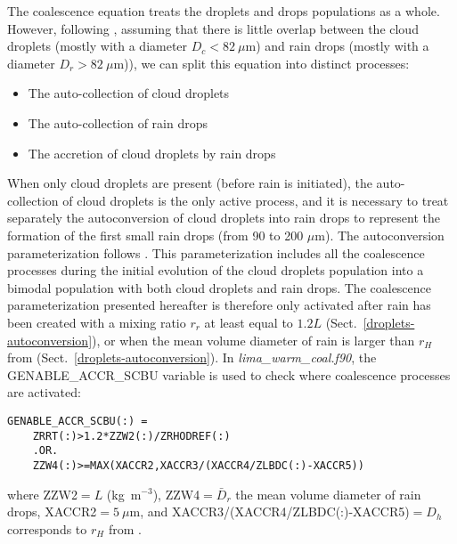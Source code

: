 {The coalescence equation treats the droplets and drops populations as a whole. However, following \citet{Cohard2000c2r2}, assuming that there is little overlap between the cloud droplets (mostly with a diameter $D_c < 82~\mu$m) and rain drops (mostly with a diameter $D_r > 82~\mu$m)), we can split this equation into distinct processes:
\begin{itemize}
 \item The auto-collection of cloud droplets
 \item The auto-collection of rain drops
 \item The accretion of cloud droplets by rain drops
\end{itemize}

When only cloud droplets are present (before rain is initiated), the auto-collection of cloud droplets is the only active process, and it is necessary to treat separately the autoconversion of cloud droplets into rain drops to represent the formation of the first small rain drops (from 90 to 200 $\mu$m). The autoconversion parameterization follows \citet{Berry1974}. This parameterization includes all the coalescence processes during the initial evolution of the cloud droplets population into a bimodal population with both cloud droplets and rain drops. The coalescence parameterization presented hereafter is therefore only activated after rain has been created with a mixing ratio $r_r$ at least equal to $1.2 L$ (Sect.\ \ref{droplets-autoconversion}), or when the mean volume diameter of rain is larger than $r_H$ from \citet{Berry1974} (Sect.\ \ref{droplets-autoconversion}). In \emph{lima\_warm\_coal.f90}, the GENABLE\_ACCR\_SCBU variable is used to check where coalescence processes are activated:
\begin{lstlisting}[frame=single]
 GENABLE_ACCR_SCBU(:) = 
 	ZRRT(:)>1.2*ZZW2(:)/ZRHODREF(:)
 	.OR.
	ZZW4(:)>=MAX(XACCR2,XACCR3/(XACCR4/ZLBDC(:)-XACCR5))
\end{lstlisting}
where ZZW2$=L$ (kg~m$^{-3}$), ZZW4$=\bar{D}_r$ the mean volume diameter of rain drops, XACCR2$=5~\mu$m, and XACCR3/(XACCR4/ZLBDC(:)-XACCR5)$=D_h$ corresponds to $r_H$ from \citet{Berry1974}.

}
